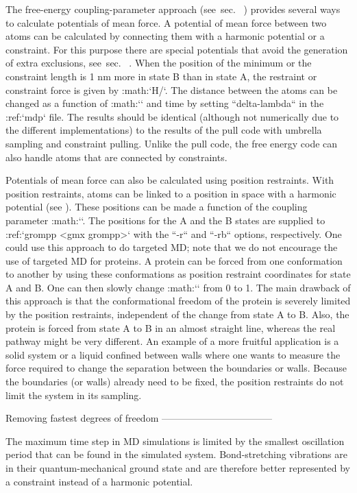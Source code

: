 The free-energy
coupling-parameter approach (see sec. 
)
provides several ways to calculate potentials of mean force. A potential
of mean force between two atoms can be calculated by connecting them
with a harmonic potential or a constraint. For this purpose there are
special potentials that avoid the generation of extra exclusions,
see sec. 
. When the position of the minimum
or the constraint length is 1 nm more in state B than in state A, the
restraint or constraint force is given by
:math:`\partial H/\partial \lambda`. The distance between the atoms can
be changed as a function of :math:`\lambda` and time by setting
``delta-lambda`` in the :ref:`mdp` file. The
results should be identical (although not numerically due to the
different implementations) to the results of the pull code with umbrella
sampling and constraint pulling. Unlike the pull code, the free energy
code can also handle atoms that are connected by constraints.

Potentials of mean force can also be calculated using position
restraints. With position restraints, atoms can be linked to a position
in space with a harmonic potential (see
). These positions can be
made a function of the coupling parameter :math:`\lambda`. The positions
for the A and the B states are supplied to :ref:`grompp <gmx grompp>` with
the ``-r`` and ``-rb`` options, respectively.
One could use this approach to do targeted
MD; note that we do not encourage the
use of targeted MD for proteins. A protein can be forced from one
conformation to another by using these conformations as position
restraint coordinates for state A and B. One can then slowly change
:math:`\lambda` from 0 to 1. The main drawback of this approach is that
the conformational freedom of the protein is severely limited by the
position restraints, independent of the change from state A to B. Also,
the protein is forced from state A to B in an almost straight line,
whereas the real pathway might be very different. An example of a more
fruitful application is a solid system or a liquid confined between
walls where one wants to measure the force required to change the
separation between the boundaries or walls. Because the boundaries (or
walls) already need to be fixed, the position restraints do not limit
the system in its sampling.

Removing fastest degrees of freedom
-----------------------------------

The maximum time step in MD simulations is limited by the smallest
oscillation period that can be found in the simulated system.
Bond-stretching vibrations are in their quantum-mechanical ground state
and are therefore better represented by a constraint instead of a
harmonic potential.

